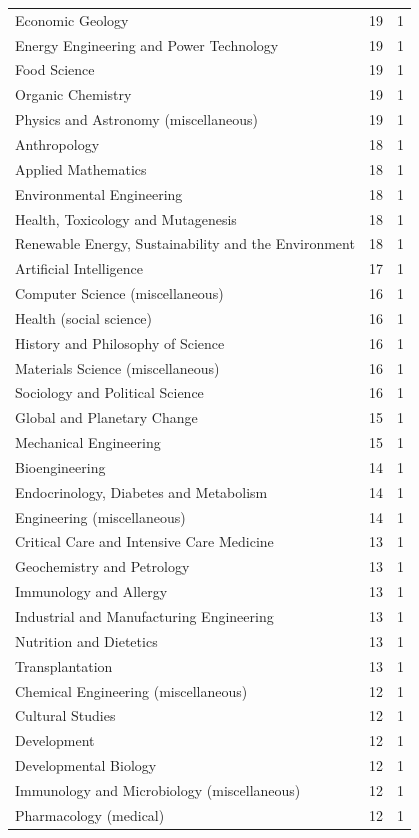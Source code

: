 \documentclass[12pt,brazil]{article}\usepackage[]{graphicx}\usepackage[]{xcolor}
\begin{document}
\begin{longtable}{lrr}
Economic Geology & 19 & 1 \\
Energy Engineering and Power Technology & 19 & 1 \\
Food Science & 19 & 1 \\
Organic Chemistry & 19 & 1 \\
Physics and Astronomy (miscellaneous) & 19 & 1 \\
Anthropology & 18 & 1 \\
Applied Mathematics & 18 & 1 \\
Environmental Engineering & 18 & 1 \\
Health, Toxicology and Mutagenesis & 18 & 1 \\
Renewable Energy, Sustainability and the Environment & 18 & 1 \\
Artificial Intelligence & 17 & 1 \\
Computer Science (miscellaneous) & 16 & 1 \\
Health (social science) & 16 & 1 \\
History and Philosophy of Science & 16 & 1 \\
Materials Science (miscellaneous) & 16 & 1 \\
Sociology and Political Science & 16 & 1 \\
Global and Planetary Change & 15 & 1 \\
Mechanical Engineering & 15 & 1 \\
Bioengineering & 14 & 1 \\
Endocrinology, Diabetes and Metabolism & 14 & 1 \\
Engineering (miscellaneous) & 14 & 1 \\
Critical Care and Intensive Care Medicine & 13 & 1 \\
Geochemistry and Petrology & 13 & 1 \\
Immunology and Allergy & 13 & 1 \\
Industrial and Manufacturing Engineering & 13 & 1 \\
Nutrition and Dietetics & 13 & 1 \\
Transplantation & 13 & 1 \\
Chemical Engineering (miscellaneous) & 12 & 1 \\
Cultural Studies & 12 & 1 \\
Development & 12 & 1 \\
Developmental Biology & 12 & 1 \\
Immunology and Microbiology (miscellaneous) & 12 & 1 \\
Pharmacology (medical) & 12 & 1 \\

\end{longtable}
\end{document}
